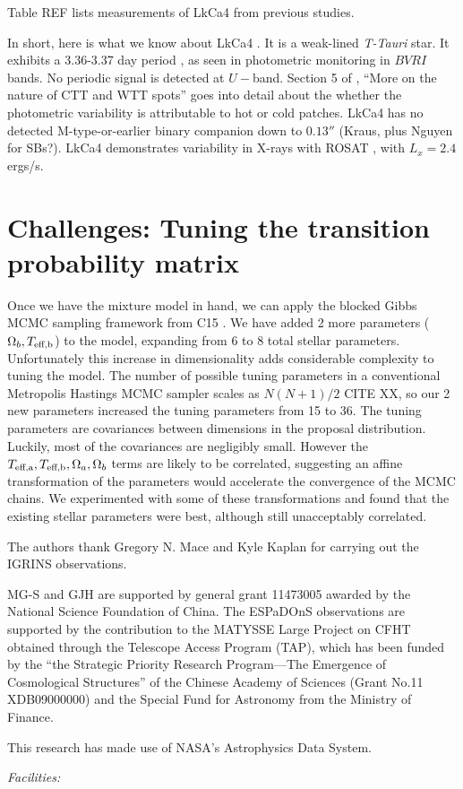 \documentclass[twocolumn]{emulateapj}%
\newcommand{\iancze}{{\sc C15 }}
\newcommand{\name}{LkCa4 }
\begin{document}
Table REF lists measurements of LkCa4 from previous studies.


In short, here is what we know about \name.  It is a weak-lined \emph{T-Tauri} star.  It exhibits a 3.36-3.37 day period \citep{vrba93,grankin94}, as seen in photometric monitoring in $BVRI$ bands.  No periodic signal is detected at $U-$band.  Section 5 of \citet{vrba93}, ``More on the nature of CTT and WTT spots'' goes into detail about the whether the photometric variability is attributable to hot or cold patches.  \name has no detected M-type-or-earlier binary companion down to $0.13''$ (Kraus, plus Nguyen for SBs?).  \name demonstrates variability in X-rays with ROSAT \citep{strom94}, with $L_{x}=2.4$ ergs/s.


\section{Challenges: Tuning the transition probability matrix}
\label{sec:MC-challenges}

Once we have the mixture model in hand, we can apply the blocked Gibbs MCMC sampling framework from \iancze.  We have added 2 more parameters ($\Omega_b, T_\textrm{eff,b}$) to the model, expanding from 6 to 8 total stellar parameters.  Unfortunately this increase in dimensionality adds considerable complexity to tuning the model.  The number of possible tuning parameters in a conventional Metropolis Hastings MCMC sampler scales as $N(N+1)/2$ CITE XX, so our 2 new parameters increased the tuning parameters from 15 to 36.  The tuning parameters are covariances between dimensions in the proposal distribution.  Luckily, most of the covariances are negligibly small.  However the $T_\textrm{eff,a}, T_\textrm{eff,b}, \Omega_a, \Omega_b$ terms are likely to be correlated, suggesting an affine transformation of the parameters would accelerate the convergence of the MCMC chains.  We experimented with some of these transformations and found that the existing stellar parameters were best, although still unacceptably correlated.


\acknowledgements
The authors thank Gregory N. Mace and Kyle Kaplan for carrying out the IGRINS observations. 

MG-S and GJH are supported by general grant 11473005 awarded by the National
Science Foundation of China.   The ESPaDOnS observations are supported by the contribution to the MATYSSE Large Project on CFHT obtained  through the Telescope Access Program (TAP), which has been funded by the ``the Strategic Priority Research Program---The Emergence of Cosmological Structures'' of the Chinese Academy of Sciences (Grant No.11 XDB09000000) and the Special Fund for Astronomy from the Ministry of Finance. 

This research has made use of NASA's Astrophysics Data System.

{\it Facilities:} 

\clearpage



\end{document}

